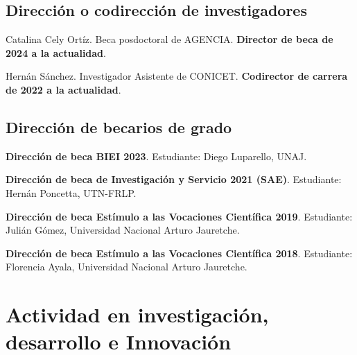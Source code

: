 \documentclass[margin,line]{res}
\begin{document}
\begin{resume}
\subsection{  Dirección o codirección de investigadores}

Catalina Cely Ortíz. Beca posdoctoral de AGENCIA. \textbf{Director de beca de 2024 a la actualidad}.

Hernán Sánchez. Investigador Asistente de CONICET. \textbf{Codirector de carrera de 2022 a la actualidad}.
%
%
%

\subsection{ Dirección de becarios de grado}

{\bf Dirección de beca BIEI 2023}. Estudiante: Diego Luparello,  UNAJ.

{\bf Dirección de beca de Investigación y Servicio 2021 (SAE)}. Estudiante: Hernán Poncetta,  UTN-FRLP.

{\bf Dirección de beca Estímulo a las Vocaciones Científica 2019}. Estudiante: Julián Gómez, Universidad Nacional Arturo Jauretche.

{\bf Dirección de beca Estímulo a las Vocaciones Científica 2018}. Estudiante: Florencia Ayala, Universidad Nacional Arturo Jauretche.
%
%
%
%

\section{ Actividad en investigación, desarrollo e Innovación}
\vspace*{-.2in}


\end{resume}
\end{document}
